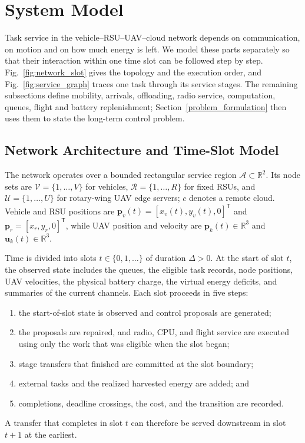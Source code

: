 \section{System Model}
\label{system_model}

Task service in the vehicle--RSU--UAV--cloud network depends on
communication, on motion and on how much energy is left. We model these
parts separately so that their interaction within one time slot can be
followed step by step. Fig.~\ref{fig:network_slot} gives the topology and the
execution order, and Fig.~\ref{fig:service_graph} traces one task through its
service stages. The remaining subsections define mobility, arrivals,
offloading, radio service, computation, queues, flight and battery
replenishment; Section~\ref{problem_formulation} then uses them to state the
long-term control problem.

\subsection{Network Architecture and Time-Slot Model}
\label{subsec:network_model}
The network operates over a bounded rectangular service region
$\mathcal A\subset\mathbb R^2$. Its node sets are
$\mathcal V=\{1,\ldots,V\}$ for vehicles,
$\mathcal R=\{1,\ldots,R\}$ for fixed RSUs, and
$\mathcal U=\{1,\ldots,U\}$ for rotary-wing UAV edge servers;
$c$ denotes a remote cloud. Vehicle and RSU positions are
$\boldsymbol p_v(t)=[x_v(t),y_v(t),0]^{\mathsf T}$ and
$\boldsymbol p_r=[x_r,y_r,0]^{\mathsf T}$, while UAV position and
velocity are $\boldsymbol p_k(t)\in\mathbb R^3$ and
$\boldsymbol u_k(t)\in\mathbb R^3$.

Time is divided into slots $t\in\{0,1,\ldots\}$ of duration $\Delta>0$.
At the start of slot $t$, the observed state includes the queues, the
eligible task records, node positions, UAV velocities, the physical battery
charge, the virtual energy deficits, and summaries of the current channels.
Each slot proceeds in five steps:
\begin{enumerate}
\item the start-of-slot state is observed and control proposals are generated;
\item the proposals are repaired, and radio, CPU, and flight service are
executed using only the work that was eligible when the slot began;
\item stage transfers that finished are committed at the slot boundary;
\item external tasks and the realized harvested energy are added; and
\item completions, deadline crossings, the cost, and the transition are
recorded.
\end{enumerate}
A transfer that completes in slot $t$ can therefore be served downstream in
slot $t+1$ at the earliest.

